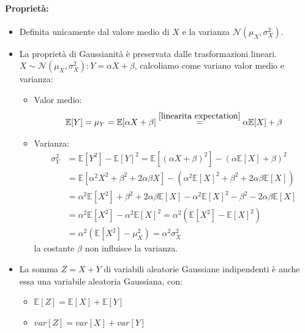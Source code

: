         \paragraph{Proprietà:}\label{proprietà distr gaussiana}
        \begin{itemize}
            \item {Definita unicamente dal valore medio di $X$ e la varianza $\mathcal{N}(\mu_X,\sigma_X^2)$.}
            \item {\begin{sloppypar}
                La proprietà di Gaussianità è preservata dalle trasformazioni lineari. ${X \sim \mathcal{N}(\mu_X,\sigma_X^2): Y = \alpha X+\beta}$, calcoliamo come variano 
                valor medio e varianza:
            \end{sloppypar}
                \begin{itemize}
                    \item {Valor medio:
                        \[
                            \mathbb{E}[Y] = \mu_Y = \mathbb{E}[\alpha X+\beta]  \overset{\ref{linearita expectation}}{=} \alpha \mathbb{E}[X] + \beta
                        \]
                    }
                    \item {Varianza:
                        \begin{align}
                            \sigma_Y^2  &= \mathbb{E}[Y^2] -\mathbb{E}[Y]^2 =\mathbb{E}[(\alpha X + \beta)^2] -(\alpha \mathbb{E}[X] + \beta)^2 \nonumber \\
                                        &= \mathbb{E}[\alpha^2 X^2 + \beta^2 +2\alpha\beta X] -(\alpha^2 \mathbb{E}[X]^2 + \beta^2 +2\alpha\beta\mathbb{E}[X])\nonumber \\
                                        &= \alpha^2 \mathbb{E}[X^2] + \beta^2 +2\alpha\beta \mathbb{E}[X] -\alpha^2 \mathbb{E}[X]^2 - \beta^2 -2\alpha\beta\mathbb{E}[X]\nonumber \\
                                        &= \alpha^2 \mathbb{E}[X^2] -\alpha^2 \mathbb{E}[X]^2 = \alpha^2 (\mathbb{E}[X^2] -\mathbb{E}[X]^2)\nonumber \\
                                        &= \alpha^2 (\mathbb{E}[X^2] -\mu_X^2)=\alpha^2 \sigma_X^2\nonumber
                        \end{align}                         
                        la costante $\beta$ non influisce la varianza.  
                    }
                \end{itemize}}
            \item {La somma $Z = X+Y$ di variabili aleatorie Gaussiane indipendenti è anche essa una variabile aleatoria
                Gaussiana, con:
                    \begin{itemize}
                        \item {$\mathbb{E}[Z] = \mathbb{E}[X] +\mathbb{E}[Y] $}
                        \item {$var[Z] = var[X] +var[Y] $}
                    \end{itemize}}
        \end{itemize}
